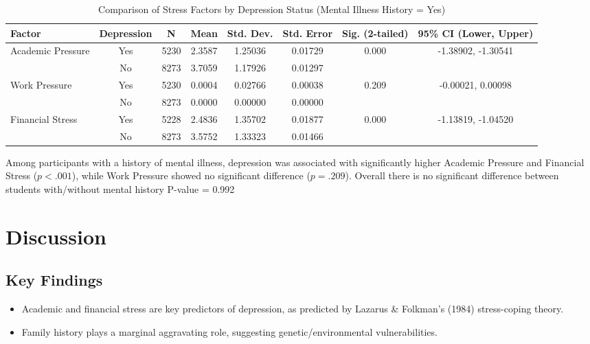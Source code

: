 \documentclass[conference]{IEEEtran}
\begin{document}
\begin{table*}[htbp]
\caption{Comparison of Stress Factors by Depression Status (Mental Illness History = Yes)}
\begin{center}
\begin{tabular}{|l|c|c|c|c|c|c|c|}
\hline
\textbf{Factor} & \textbf{Depression} & \textbf{N} & \textbf{Mean} & \textbf{Std. Dev.} & \textbf{Std. Error} & \textbf{Sig. (2-tailed)} & \textbf{95\% CI (Lower, Upper)} \\
\hline
\multirow{2}{*}{Academic Pressure} & Yes & 5230 & 2.3587 & 1.25036 & 0.01729 & \multirow{2}{*}{0.000} & -1.38902, -1.30541 \\
                                   & No  & 8273 & 3.7059 & 1.17926 & 0.01297 &                        &                     \\
\hline
\multirow{2}{*}{Work Pressure}     & Yes & 5230 & 0.0004 & 0.02766 & 0.00038 & \multirow{2}{*}{0.209} & -0.00021, 0.00098 \\
                                   & No  & 8273 & 0.0000 & 0.00000 & 0.00000 &                        &                    \\
\hline
\multirow{2}{*}{Financial Stress}  & Yes & 5228 & 2.4836 & 1.35702 & 0.01877 & \multirow{2}{*}{0.000} & -1.13819, -1.04520 \\
                                   & No  & 8273 & 3.5752 & 1.33323 & 0.01466 &                        &                   \\
\hline
\end{tabular}
\label{tab:depression_factors_mih_yes}
\end{center}
\vspace{-1em}
\begin{flushleft}
\footnotesize  Among participants with a history of mental illness, depression was associated with significantly higher Academic Pressure and Financial Stress ($p < .001$), while Work Pressure showed no significant difference ($p = .209$). Overall there is no significant difference between students with/without mental history P-value = 0.992
\end{flushleft}
\end{table*}

\section{Discussion}
\subsection{Key Findings}
\begin{itemize}
    \item Academic and financial stress are key predictors of depression, as predicted by Lazarus \& Folkman's (1984) stress-coping theory.
    \item Family history plays a marginal aggravating role, suggesting genetic/environmental vulnerabilities.
\end{itemize}
\end{document}
